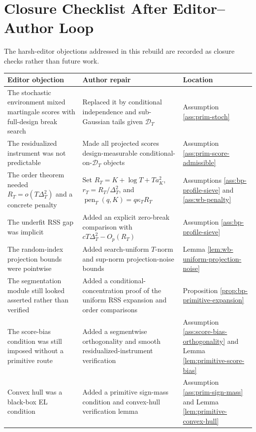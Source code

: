 \documentclass[12pt]{article}
\numberwithin{equation}{section}
\theoremstyle{definition}
\newcommand{\D}{\mathcal D}
\begin{document}
\section{Closure Checklist After Editor--Author Loop}

The harsh-editor objections addressed in this rebuild are recorded as closure
checks rather than future work.

\begin{center}
\small
\begin{tabular}{>{\raggedright\arraybackslash}p{}
                >{\raggedright\arraybackslash}p{}
                >{\raggedright\arraybackslash}p{}}
\hline
Editor objection & Author repair & Location \\
\hline
The stochastic environment mixed martingale scores with full-design break search & Replaced it by conditional independence and sub-Gaussian tails given \(\D_T\) & Assumption \ref{ass:prim-stoch} \\
The residualized instrument was not predictable & Made all projected scores design-measurable conditional-on-\(\D_T\) objects & Assumption \ref{ass:prim-score-admissible} \\
The order theorem needed \(R_T=o(T\Delta_T^2)\) and a concrete penalty & Set \(R_T=K+\log T+Ta_K^2\), \(r_T=R_T/\Delta_T^2\), and \(\operatorname{pen}_T(q,K)=q\kappa_TR_T\) & Assumptions \ref{ass:bp-profile-sieve} and \ref{ass:wb-penalty} \\
The underfit RSS gap was implicit & Added an explicit zero-break comparison with \(cT\Delta_T^2-O_p(R_T)\) & Assumption \ref{ass:bp-profile-sieve} \\
The random-index projection bounds were pointwise & Added search-uniform \(T\)-norm and sup-norm projection-noise bounds & Lemma \ref{lem:wb-uniform-projection-noise} \\
The segmentation module still looked asserted rather than verified & Added a conditional-concentration proof of the uniform RSS expansion and order comparisons & Proposition \ref{prop:bp-primitive-expansion} \\
The score-bias condition was still imposed without a primitive route & Added a segmentwise orthogonality and smooth residualized-instrument verification & Assumption \ref{ass:score-bias-orthogonality} and Lemma \ref{lem:primitive-score-bias} \\
Convex hull was a black-box EL condition & Added a primitive sign-mass condition and convex-hull verification lemma & Assumption \ref{ass:prim-sign-mass} and Lemma \ref{lem:primitive-convex-hull} \\

\end{tabular}
\end{center}
\end{document}
